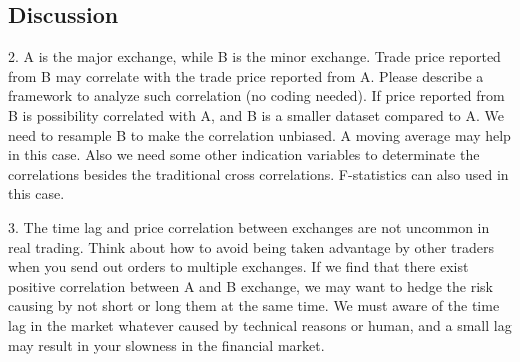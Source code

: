 \documentclass[12pt,a4paper]{article}
\begin{document}
\subsection{Discussion}
2.
A is the major exchange, while B is the minor exchange. Trade price reported from B may correlate with the trade price reported from A. Please describe a framework to analyze such correlation (no coding needed).
If price reported from B is possibility correlated with A, and B is a smaller dataset compared to A. We need to resample B to make the correlation unbiased. A moving average may help in this case. 
Also we need some other indication variables to determinate the correlations besides the traditional cross correlations. F-statistics can also used in this case.

3. The time lag and price correlation between exchanges are not uncommon in real trading. Think about how to avoid being taken advantage by other traders when you send out orders to multiple exchanges.
If we find that there exist positive correlation between A and B exchange, we may want to hedge the risk causing by not short or long them at the same time. We must aware of the time lag in the market whatever caused by technical reasons or human, and a small lag may result in your slowness in the financial market.
\end{document}
